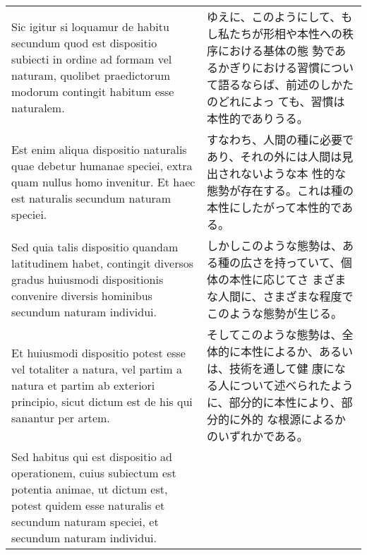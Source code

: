 \documentclass[10pt]{jsarticle} %
\begin{document}
\begin{longtable}{p{21em}p{21em}}
\\



Sic igitur si loquamur de habitu secundum quod est dispositio subiecti
in ordine ad formam vel naturam, quolibet praedictorum modorum
contingit habitum esse naturalem.


&

ゆえに、このようにして、もし私たちが形相や本性への秩序における基体の態
 勢であるかぎりにおける習慣について語るならば、前述のしかたのどれによっ
 ても、習慣は本性的でありうる。

\\



Est enim aliqua dispositio naturalis quae debetur humanae speciei,
extra quam nullus homo invenitur. Et haec est naturalis secundum
naturam speciei.



&

すなわち、人間の種に必要であり、それの外には人間は見出されないような本
 性的な態勢が存在する。これは種の本性にしたがって本性的である。

\\



Sed quia talis dispositio quandam latitudinem habet, contingit
diversos gradus huiusmodi dispositionis convenire diversis hominibus
secundum naturam individui.


&

しかしこのような態勢は、ある種の広さを持っていて、個体の本性に応じてさ
 まざまな人間に、さまざまな程度でこのような態勢が生じる。

\\



Et huiusmodi dispositio potest esse vel totaliter a natura, vel partim
a natura et partim ab exteriori principio, sicut dictum est de his qui
sanantur per artem.


&

そしてこのような態勢は、全体的に本性によるか、あるいは、技術を通して健
 康になる人について述べられたように、部分的に本性により、部分的に外的
 な根源によるかのいずれかである。

\\



Sed habitus qui est dispositio ad operationem, cuius subiectum est
potentia animae, ut dictum est, potest quidem esse naturalis et
secundum naturam speciei, et secundum naturam individui.



\end{longtable}
\end{document}
